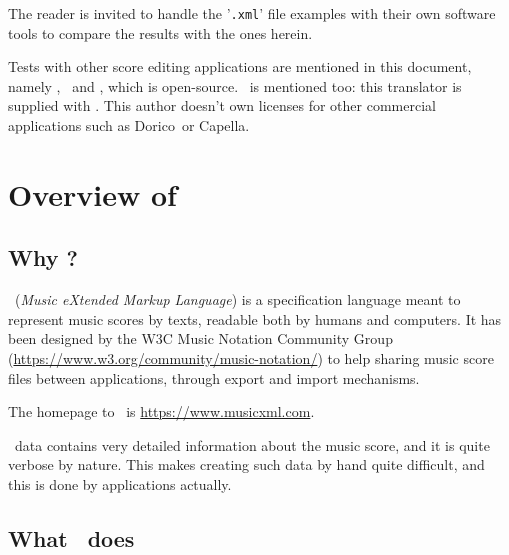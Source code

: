 \documentclass[12pt,a4paper]{article}
\begin{document}
The reader is invited to handle the '{\tt .xml}' file examples with their own software tools to compare the results with the ones herein.

Tests with other score editing applications are mentioned in this document, namely \sib,
\fin\ and \muse, which is open-source.
\mxmlToly\ is mentioned too: this translator is supplied with \lily.
This author doesn't own licenses for other commercial applications such as Dorico\texttrademark\ or Capella\texttrademark.


\section{Overview of \xmlToly\ }

\subsection{Why \xmlToly?}

\mxml\ ({\it Music eXtended Markup Language}) is a specification language meant to represent music scores by texts, readable both by humans and computers. It has been designed by the W3C Music Notation Community Group (\url{https://www.w3.org/community/music-notation/}) to help sharing music score files between applications, through export and import mechanisms.

The homepage to \mxml\ is \url{https://www.musicxml.com}.

\mxml\ data contains very detailed information about the music score, and it is quite verbose by nature. This makes creating such data by hand quite difficult, and this is done by applications actually.

\subsection{What \xmlToly\ does}



\pagebreak

\lstlistoflistings


\tableofcontents


\end{document}
